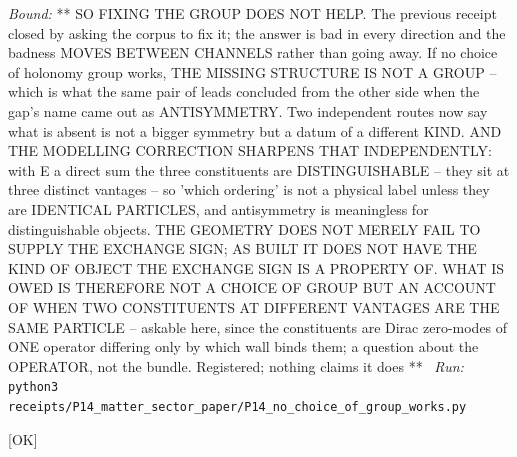 \begin{description}
 \emph{Bound:} ** SO FIXING THE GROUP DOES NOT HELP. The previous receipt closed by asking the corpus to fix it; the answer is bad in every direction and the badness MOVES BETWEEN CHANNELS rather than going away. If no choice of holonomy group works, THE MISSING STRUCTURE IS NOT A GROUP -- which is what the same pair of leads concluded from the other side when the gap's name came out as ANTISYMMETRY. Two independent routes now say what is absent is not a bigger symmetry but a datum of a different KIND. AND THE MODELLING CORRECTION SHARPENS THAT INDEPENDENTLY: with E a direct sum the three constituents are DISTINGUISHABLE -- they sit at three distinct vantages -- so 'which ordering' is not a physical label unless they are IDENTICAL PARTICLES, and antisymmetry is meaningless for distinguishable objects. THE GEOMETRY DOES NOT MERELY FAIL TO SUPPLY THE EXCHANGE SIGN; AS BUILT IT DOES NOT HAVE THE KIND OF OBJECT THE EXCHANGE SIGN IS A PROPERTY OF. WHAT IS OWED IS THEREFORE NOT A CHOICE OF GROUP BUT AN ACCOUNT OF WHEN TWO CONSTITUENTS AT DIFFERENT VANTAGES ARE THE SAME PARTICLE -- askable here, since the constituents are Dirac zero-modes of ONE operator differing only by which wall binds them; a question about the OPERATOR, not the bundle. Registered; nothing claims it does **
\ \emph{Run:} \texttt{python3 receipts/P14\_matter\_sector\_paper/P14\_no\_choice\_of\_group\_works.py}
\item[\label{rcpt:P14_statistics_not_gauge}\texttt{P14\_statistics\_not\_gauge}]\hfill\textsf{[OK]}\\

\end{description}
